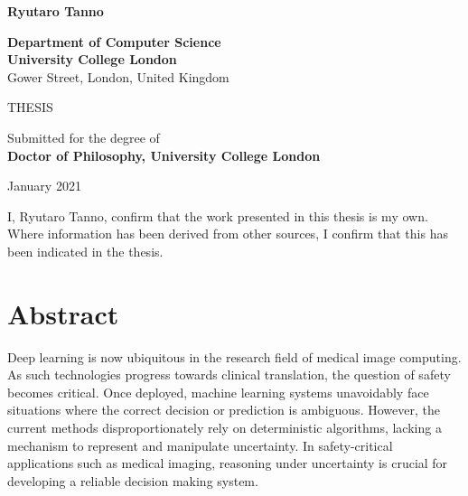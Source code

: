\documentclass[12pt,a4paper,twoside]{book}
\begin{document}
\begin{titlepage}
\begin{center}
{\vspace{5em}
\LARGE \textbf{Ryutaro Tanno}
 \vspace{3em}%
\begin{center}%
	\large
	\textbf{Department of Computer Science} \\
	\textbf{University College London}\\
	Gower Street, London, United Kingdom\\
\end{center}%
\vspace{4em}%


\begin{center}%
	\large THESIS %
	\vspace{1em}
\end{center}%

 \begin{center}%
 	\large
	Submitted for the degree of \\
	\textbf{Doctor of Philosophy, University College London} \\
\end{center}%
\vspace{1em}%



 \vfill
% 
% 

{\Large January 2021}

}
\end{center}
\end{titlepage}


\clearpage


I, Ryutaro Tanno, confirm that the work presented in this thesis is my own. Where information has been derived from other sources, I confirm that this has been indicated in the thesis.

\clearpage


\chapter*{Abstract}
Deep learning is now ubiquitous in the research field of medical image computing. As such technologies progress towards clinical translation, the question of safety becomes critical. Once deployed, machine learning systems unavoidably face situations where the correct decision or prediction is ambiguous. However, the current methods disproportionately rely on deterministic algorithms, lacking a mechanism to represent and manipulate uncertainty. In safety-critical applications such as medical imaging, reasoning under uncertainty is crucial for developing a reliable decision making system. 
\end{document}
